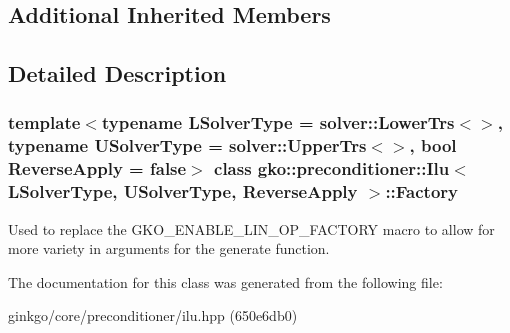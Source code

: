 \subsection*{Additional Inherited Members}


\subsection{Detailed Description}
\subsubsection*{template$<$typename L\+Solver\+Type = solver\+::\+Lower\+Trs$<$$>$, typename U\+Solver\+Type = solver\+::\+Upper\+Trs$<$$>$, bool Reverse\+Apply = false$>$\newline
class gko\+::preconditioner\+::\+Ilu$<$ L\+Solver\+Type, U\+Solver\+Type, Reverse\+Apply $>$\+::\+Factory}

Used to replace the {\ttfamily G\+K\+O\+\_\+\+E\+N\+A\+B\+L\+E\+\_\+\+L\+I\+N\+\_\+\+O\+P\+\_\+\+F\+A\+C\+T\+O\+RY} macro to allow for more variety in arguments for the {\ttfamily generate} function. 

The documentation for this class was generated from the following file\+:\begin{DoxyCompactItemize}
\item 
ginkgo/core/preconditioner/ilu.\+hpp (650e6db0)\end{DoxyCompactItemize}
